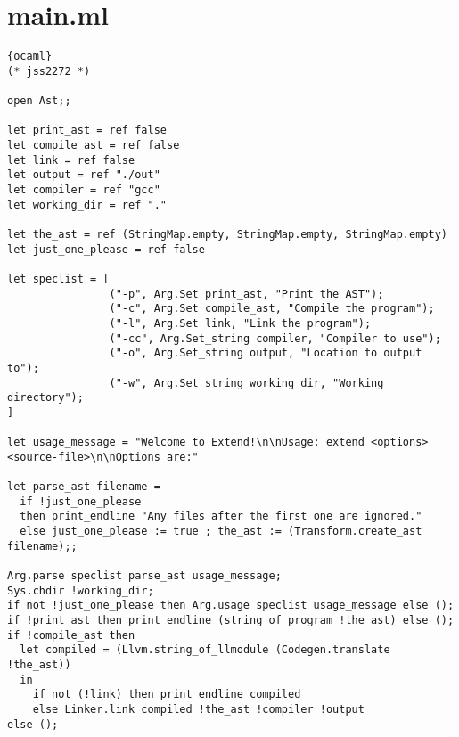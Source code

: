 \section{main.ml}
\begin{lstlisting}{ocaml}
(* jss2272 *)

open Ast;;

let print_ast = ref false
let compile_ast = ref false
let link = ref false
let output = ref "./out"
let compiler = ref "gcc"
let working_dir = ref "."

let the_ast = ref (StringMap.empty, StringMap.empty, StringMap.empty)
let just_one_please = ref false

let speclist = [
                ("-p", Arg.Set print_ast, "Print the AST");
                ("-c", Arg.Set compile_ast, "Compile the program");
                ("-l", Arg.Set link, "Link the program");
                ("-cc", Arg.Set_string compiler, "Compiler to use");
                ("-o", Arg.Set_string output, "Location to output to");
                ("-w", Arg.Set_string working_dir, "Working directory");
]

let usage_message = "Welcome to Extend!\n\nUsage: extend <options> <source-file>\n\nOptions are:"

let parse_ast filename =
  if !just_one_please
  then print_endline "Any files after the first one are ignored."
  else just_one_please := true ; the_ast := (Transform.create_ast filename);;

Arg.parse speclist parse_ast usage_message;
Sys.chdir !working_dir;
if not !just_one_please then Arg.usage speclist usage_message else ();
if !print_ast then print_endline (string_of_program !the_ast) else ();
if !compile_ast then
  let compiled = (Llvm.string_of_llmodule (Codegen.translate !the_ast))
  in
    if not (!link) then print_endline compiled
    else Linker.link compiled !the_ast !compiler !output
else ();
\end{lstlisting}
